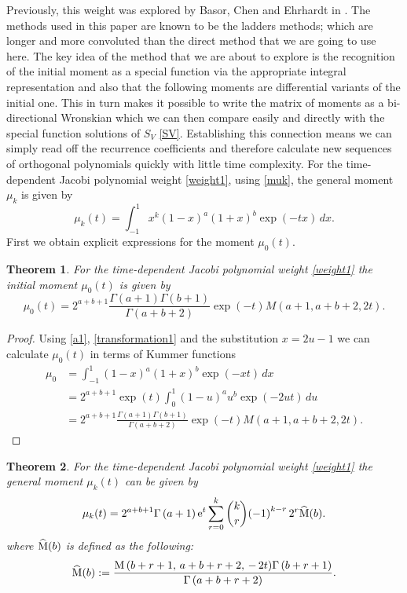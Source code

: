 \documentclass[12pt]{article}
\newtheorem{mydef}{Theorem}[section]
\numberwithin{figure}{section}
\numberwithin{equation}{section}
\numberwithin{table}{section}
\begin{document}
Previously, this weight was explored by Basor, Chen and Ehrhardt in \cite{Basor}. The methods used in this paper are known to be the ladders methods; which are longer and more convoluted than the direct method that we are going to use here. The key idea of the method that we are about to explore is the recognition of the initial moment as a special function via the appropriate integral representation and also that the following moments are differential variants of the initial one. This in turn makes it possible to write the matrix of moments as a bi-directional Wronskian which we can then compare easily and directly with the special function solutions of $S_V$ \eqref{SV}. Establishing this connection means we can simply read off the recurrence coefficients and therefore calculate new sequences of orthogonal polynomials quickly with little time complexity.
For the time-dependent Jacobi polynomial weight \eqref{weight1}, using \eqref{muk}, the  general moment $\mu_k$ is given by
\begin{equation}
\mu_k(t)=\int^1_{-1}x^k(1-x)^ a(1+x)^ b\exp(-tx)\,dx.\label{op}
\end{equation}
First we obtain explicit expressions for the moment $\mu_0(t)$.
\begin{mydef}
For the time-dependent Jacobi polynomial weight \eqref{weight1} the initial moment $\mu_0(t)$ is given by
\begin{equation}\nonumber
\mu_0(t)=2^{ a+ b+1}\frac{\Gamma( a+1)\Gamma( b+1)}{\Gamma( a+ b+2)}\exp(-t)M( a+1, a+ b+2,2t).
\end{equation}
\end{mydef}
\begin{proof}
Using \eqref{a1}, \eqref{transformation1} and the substitution $x=2u-1$ we can calculate $\mu_0(t)$ in terms of Kummer functions
\begin{align}\nonumber
\mu_{0}
&=\int^1_{-1}(1-x)^ a(1+x)^ b\exp(-xt)\,dx\\\nonumber
&=2^{ a+ b+1}\exp(t)\int^1_0(1-u)^ a u^ b\exp(-2ut)\,du\\\nonumber
&=2^{ a+ b+1}\frac{\Gamma( a+1)\Gamma( b+1)}{\Gamma( a+ b+2)}\exp(-t)M( a+1, a+ b+2,2t).
\end{align}
\end{proof}
\begin{mydef}
For the time-dependent Jacobi polynomial weight \eqref{weight1} the general moment $\mu_k(t)$ can be given by
\begin{equation}\label{muk1}
\mu_k(t)={2}^{ a+ b+1}\Gamma  \left(  a+1 \right){{\rm e}^{t}}\sum _{r=0}^{k
}\binom{k}{r}{\left( -1
 \right) ^{k-r}{2}^{r}
{\widehat{\rm M}(b)}}.
\end{equation}where $\widehat{\rm M}(b)$ is defined as the following:
$$\widehat{\rm M}(b):=\frac{{{\rm M}\left( b+r+1,\, a+ b+r+2,\,-\,2t\right)}\Gamma  \left(  b+r+1 \right) }{\Gamma  \left(  a
+ b+r+2 \right)   }.$$
\end{mydef}
\end{document}
